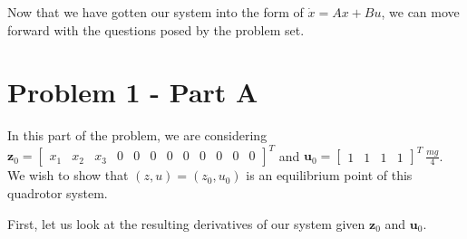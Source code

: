 \documentclass{article}
\begin{document}
Now that we have gotten our system into the form of $\dot{x} = Ax + Bu$, we can move forward with the questions posed by the problem set.

\section*{Problem 1 - Part A}

In this part of the problem, we are considering $ \boldsymbol{z}_0 = \begin{bmatrix}
    x_1 & x_2 & x_3 & 0 & 0 & 0 & 0 & 0 & 0 & 0 & 0 & 0
\end{bmatrix}^T$ and $ \boldsymbol{u}_0 = \begin{bmatrix}
    1 & 1 & 1 & 1
\end{bmatrix}^T \ \frac{mg}{4}$. We wish to show that $(z, u) = (z_0, u_0)$ is an equilibrium point of this quadrotor system.

First, let us look at the resulting derivatives of our system given $\boldsymbol{z}_0$ and $\boldsymbol{u}_0$.
\end{document}
